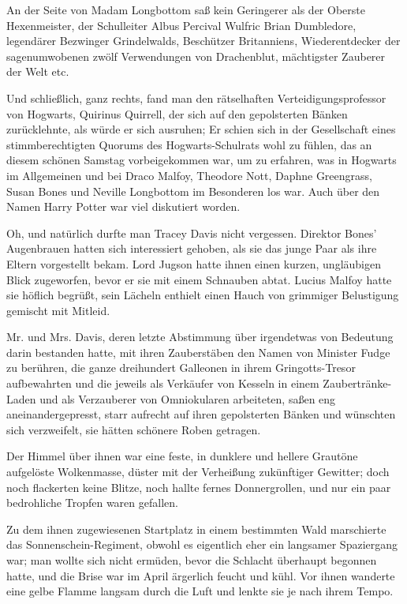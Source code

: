{An der Seite von Madam Longbottom saß kein Geringerer als der Oberste Hexenmeister, der Schulleiter Albus Percival Wulfric Brian Dumbledore, legendärer Bezwinger Grindelwalds, Beschützer Britanniens, Wiederentdecker der sagenumwobenen zwölf Verwendungen von Drachenblut, mächtigster Zauberer der Welt etc.

Und schließlich, ganz rechts, fand man den rätselhaften Verteidigungsprofessor von Hogwarts, Quirinus Quirrell, der sich auf den gepolsterten Bänken zurücklehnte, als würde er sich ausruhen; Er schien sich in der Gesellschaft eines stimmberechtigten Quorums des Hogwarts-Schulrats wohl zu fühlen, das an diesem schönen Samstag vorbeigekommen war, um zu erfahren, was in Hogwarts im Allgemeinen und bei Draco Malfoy, Theodore Nott, Daphne Greengrass, Susan Bones und Neville Longbottom im Besonderen los war. Auch über den Namen Harry Potter war viel diskutiert worden.

Oh, und natürlich durfte man Tracey Davis nicht vergessen. Direktor Bones' Augenbrauen hatten sich interessiert gehoben, als sie das junge Paar als ihre Eltern vorgestellt bekam. Lord Jugson hatte ihnen einen kurzen, ungläubigen Blick zugeworfen, bevor er sie mit einem Schnauben abtat. Lucius Malfoy hatte sie höflich begrüßt, sein Lächeln enthielt einen Hauch von grimmiger Belustigung gemischt mit Mitleid.

Mr. und Mrs. Davis, deren letzte Abstimmung über irgendetwas von Bedeutung darin bestanden hatte, mit ihren Zauberstäben den Namen von Minister Fudge zu berühren, die ganze dreihundert Galleonen in ihrem Gringotts-Tresor aufbewahrten und die jeweils als Verkäufer von Kesseln in einem Zaubertränke-Laden und als Verzauberer von Omniokularen arbeiteten, saßen eng aneinandergepresst, starr aufrecht auf ihren gepolsterten Bänken und wünschten sich verzweifelt, sie hätten schönere Roben getragen.

Der Himmel über ihnen war eine feste, in dunklere und hellere Grautöne aufgelöste Wolkenmasse, düster mit der Verheißung zukünftiger Gewitter; doch noch flackerten keine Blitze, noch hallte fernes Donnergrollen, und nur ein paar bedrohliche Tropfen waren gefallen.

Zu dem ihnen zugewiesenen Startplatz in einem bestimmten Wald marschierte das Sonnenschein-Regiment, obwohl es eigentlich eher ein langsamer Spaziergang war; man wollte sich nicht ermüden, bevor die Schlacht überhaupt begonnen hatte, und die Brise war im April ärgerlich feucht und kühl. Vor ihnen wanderte eine gelbe Flamme langsam durch die Luft und lenkte sie je nach ihrem Tempo.

}
